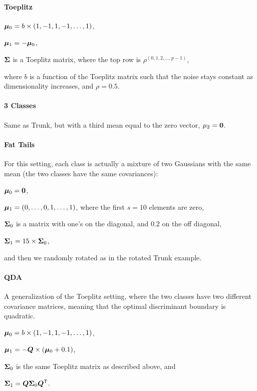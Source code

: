 \documentclass[10pt]{article}
\begin{document}
\paragraph*{Toeplitz}
\begin{compactitem}
\item $\boldsymbol{\mu}_0=b \times (1,-1,1,-1,\ldots,1)$,
\item $\boldsymbol{\mu}_1= - \boldsymbol{\mu}_0$,
\item $\boldsymbol{\Sigma}$ is a Toeplitz matrix, where the top row is $\rho^{(0,1,2,\ldots,p-1)}$,
\end{compactitem}
where $b$ is a function of the Toeplitz matrix such that the noise stays constant as dimensionality increases, and $\rho=0.5$.






\paragraph*{3 Classes} Same as Trunk, but with a third mean equal to the zero vector, $\mu_2=\boldsymbol{0}$.


\paragraph*{Fat Tails} For this setting, each class is actually a mixture of two Gaussians with the same mean (the two classes have the same covariances):
\begin{compactitem}
\item $\boldsymbol{\mu}_0=\boldsymbol{0}$,
\item $\boldsymbol{\mu}_1=(0,\ldots,0,1,\ldots,1)$, where the first $s=10$ elements are zero,
\item $\boldsymbol{\Sigma}_0$ is a matrix with one's on the diagonal, and $0.2$ on the off diagonal,
\item $\boldsymbol{\Sigma}_1 = 15 \times \boldsymbol{\Sigma}_0$,
\end{compactitem}
and then we randomly rotated as in the rotated Trunk example.




\paragraph*{QDA} A generalization of the Toeplitz setting, where the two classes have two different covariance matrices, meaning that the optimal discriminant boundary is quadratic.
\begin{compactitem}
\item $\boldsymbol{\mu}_0=b \times (1,-1,1,-1,\ldots,1)$,
\item $\boldsymbol{\mu}_1=-\boldsymbol{Q} \times (\boldsymbol{\mu}_0+0.1)$,
\item $\boldsymbol{\Sigma}_0$ is the same Toeplitz matrix as described above, and
\item $\boldsymbol{\Sigma}_1 = \boldsymbol{Q} \boldsymbol{\Sigma}_0 \boldsymbol{Q}^{\mathsf{T}}$.
\end{compactitem}
\end{document}
